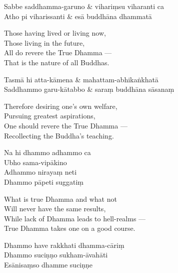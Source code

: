 \begin{twochants}
  Sabbe saddhamma-garuno & vihariṃsu viharanti ca \\
  Atho pi viharissanti & esā buddhāna dhammatā \\
\end{twochants}

\begin{english}
  Those having lived or living now,\\
  Those living in the future,\\
  All do revere the True Dhamma ---\\
  That is the nature of all Buddhas.
\end{english}

\begin{twochants}
  Tasmā hi atta-kāmena & mahattam-abhikaṅkhatā \\
  Saddhammo garu-kātabbo & saraṃ buddhāna sāsanaṃ \\
\end{twochants}

\begin{english}
  Therefore desiring one's own welfare,\\
  Pursuing greatest aspirations,\\
  One should revere the True Dhamma ---\\
  Recollecting the Buddha's teaching.
\end{english}


\begin{paritta}
Na hi dhammo adhammo ca\\
Ubho sama-vipākino \\
Adhammo nirayaṃ neti\\
Dhammo pāpeti suggatiṃ
\end{paritta}

\begin{english}
  What is true Dhamma and what not\\
  Will never have the same results,\\
  While lack of Dhamma leads to hell-realms ---\\
  True Dhamma takes one on a good course.
\end{english}

\begin{paritta}
Dhammo have rakkhati dhamma-cāriṃ\\
Dhammo suciṇṇo sukham-āvahāti\\
Esānisaṃso dhamme suciṇṇe
\end{paritta}

